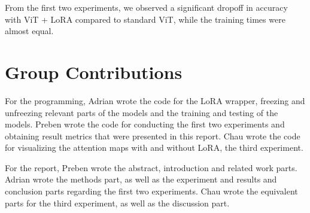 \documentclass[10pt]{article}
\begin{document}
From the first two experiments, we observed a significant dropoff in accuracy with ViT + LoRA compared to standard ViT, while the training times were almost equal.

\section{Group Contributions}

For the programming, Adrian wrote the code for the LoRA wrapper, freezing and unfreezing relevant parts of the models and the training and testing of the models. Preben wrote the code for conducting the first two experiments and obtaining result metrics that were presented in this report. Chau wrote the code for visualizing the attention maps with and without LoRA, the third experiment.

For the report, Preben wrote the abstract, introduction and related work parts. Adrian wrote the methods part, as well as the experiment and results and conclusion parts regarding the first two experiments. Chau wrote the equivalent parts for the third experiment, as well as the discussion part.



\end{document}
